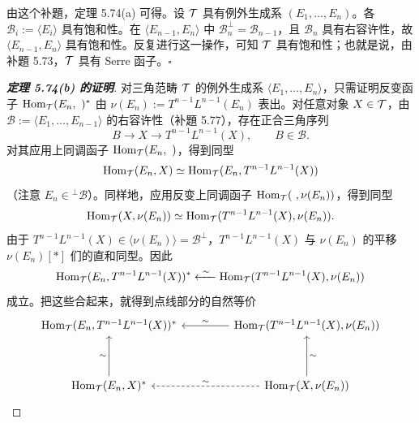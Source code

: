 由这个补題，定理 5.74(a) 可得。设 $\mathcal{T}$ 具有例外生成系 $(E_{1},\ldots,E_{n})$。各 $\mathcal{B}_{i} := \langle E_{i}\rangle$ 具有饱和性。在 $\langle E_{n-1},E_{n}\rangle$ 中 $\mathcal{B}_{n}^{\perp} = \mathcal{B}_{n-1}$，且 $\mathcal{B}_{n}$ 具有右容许性，故 $\langle E_{n-1},E_{n}\rangle$ 具有饱和性。反复进行这一操作，可知 $\mathcal{T}$ 具有饱和性；也就是说，由补題 5.73，$\mathcal{T}$ 具有 Serre 函子。\hfill$\square$


\begin{proof}[\bfseries 定理 5.74(b) 的证明]
对三角范畴 $\mathcal{T}$ 的例外生成系 $\langle E_{1},\ldots,E_{n}\rangle$，只需证明反变函子 $\operatorname{Hom}_{\mathcal{T}}(E_{n},\ )^{*}$ 由 $\nu(E_{n}) := T^{n-1}L^{n-1}(E_{n})$ 表出。对任意对象 $X \in \mathcal{T}$，由 $\mathcal{B} := \langle E_{1},\ldots,E_{n-1}\rangle$ 的右容许性（补題 5.77），存在正合三角序列
\[
  B \to X \to T^{n-1}L^{n-1}(X), \qquad B \in \mathcal{B}.
\]
对其应用上同调函子 $\Hom_{\cT}(E_{n},\ )$，得到同型
\[
  \operatorname{Hom}_{\mathcal{T}}(E_{n},X) \simeq \operatorname{Hom}_{\mathcal{T}}(E_{n},T^{n-1}L^{n-1}(X))
\]
（注意 $E_{n} \in {}^{\perp}\mathcal{B}$）。同样地，应用反变上同调函子 $\operatorname{Hom}_{\mathcal{T}}(\ ,\nu(E_{n}))$，得到同型
\[
  \operatorname{Hom}_{\mathcal{T}}(X,\nu(E_{n})) \simeq \operatorname{Hom}_{\mathcal{T}}(T^{n-1}L^{n-1}(X),\nu(E_{n})).
\]
由于 $T^{n-1}L^{n-1}(X) \in \langle\nu(E_{n})\rangle = \mathcal{B}^{\perp}$，$T^{n-1}L^{n-1}(X)$ 与 $\nu(E_{n})$ 的平移 $\nu(E_{n})[*]$ 们的直和同型。因此
\[
  \operatorname{Hom}_{\mathcal{T}}(E_{n},T^{n-1}L^{n-1}(X))^{*} \xleftarrow{\ \sim\ } \operatorname{Hom}_{\mathcal{T}}(T^{n-1}L^{n-1}(X),\nu(E_{n}))
\]
成立。把这些合起来，就得到点线部分的自然等价
\[
\begin{tikzcd}[row sep=3.6em, column sep=4.2em]
  \Hom_{\cT}(E_{n},T^{n-1}L^{n-1}(X))^{*} & \Hom_{\cT}(T^{n-1}L^{n-1}(X),\nu(E_{n})) \arrow[l,"\sim" above]\\
  \Hom_{\cT}(E_{n},X)^{*} \arrow[u,"\sim" left] & \Hom_{\cT}(X,\nu(E_{n})) \arrow[l,dashed,"\sim" above] \arrow[u,"\sim" right]
\end{tikzcd}
\]
\end{proof}


